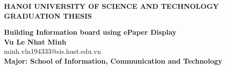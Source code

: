 \documentclass[Main.tex]{subfiles}
\begin{document}
\begin{titlepage}
\thispagestyle{empty}
\begin{center}

{\textbf{\large{HANOI UNIVERSITY OF SCIENCE AND TECHNOLOGY }}}\\[4cm]

{\textbf{\huge{GRADUATION THESIS}}}\\[1cm]
{\textbf{\Large{Building Information board using ePaper Display}}\\[1cm]

{\textbf{\large{Vu Le Nhat Minh}}}\\
{\large{minh.vln194333@sis.hust.edu.vn}}\\[0.5cm]

{\textbf{\large{Major: School of Information, Communication and Technology}}}\\

\vspace{2cm}
\begin{table}[H]
\centering
{}
\end{table}}
\end{center}



\end{titlepage}
\end{document}
